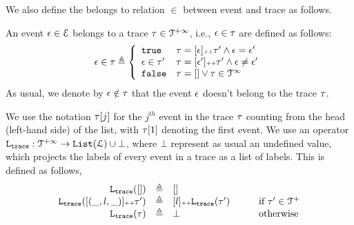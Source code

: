 We also define the belongs to relation $\in$ between event and trace as follows.
\begin{defn}
  An event $\mathtt{\epsilon} \in \mathcal{E}$ belongs to a trace $\mathtt{\tau} \in \mathcal{T}^{+\infty}$, i.e., $\mathtt{\epsilon} \in \mathtt{\tau}$ are defined as follows:
 \begin{equation*}
  \event \in \trace 
  \triangleq \left\{
  \begin{array}{ll} 
  \etrue & \trace = [\event] \tracecat \trace'
  \land \event = \event' \\
  \event \in \trace' & \trace = [\event'] \tracecat \trace'
  \land \event \neq \event' \\ 
  \efalse & \trace = [] \lor \trace \in \inftdom
  \end{array}
  \right.
 \end{equation*}
 As usual, we denote by $\mathtt{\epsilon} \notin \mathtt{\tau}$ that the event $\mathtt{\epsilon}$ doesn't belong to the trace $\mathtt{\tau}$.
 \end{defn}
 
We use the notation $\mathtt{\tau}[j]$ for the $j^{th}$ event in the trace $\mathtt{\tau}$ counting from the head (left-hand side) of the list, with $\mathtt{\tau}[1]$ denoting the first event.
We use an operator $\mathtt{L}_{\mathtt{{trace}}}: \mathcal{T}^{+\infty} \to \mathtt{List}(\mathcal{L})\cup \bot$, where $\bot$ represent as usual an undefined value, which projects the labels of every event in a trace as a list of labels. This is defined as follows,
\[
\begin{array}{rcll}
\mathtt{L}_{\mathtt{{trace}}}([]) &\triangleq & [] &\qquad  
\\ 
\mathtt{L}_{\mathtt{{trace}}}([(\_, l, \_)] {\scriptscriptstyle ++} \mathtt{\tau}') &\triangleq & [l] {\scriptscriptstyle ++} \mathtt{L}_{\mathtt{{trace}}}(\mathtt{\tau}') &\qquad  \mbox{if}\ \mathtt{\tau}'\in\mathcal{T}^{+}
\\
\mathtt{L}_{\mathtt{{trace}}}(\tau) &\triangleq & \bot  &\qquad  \mbox{otherwise}
\end{array}
\]
%
